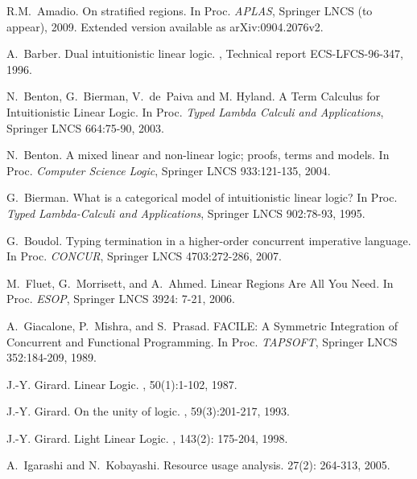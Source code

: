 \documentclass[11pt]{article}
\begin{document}
{\footnotesize

\begin{thebibliography}{99}

R.M.~Amadio.
\newblock On stratified regions.
\newblock In Proc. {\em APLAS}, Springer LNCS (to appear), 2009.
\newblock Extended version available as {\sf arXiv:0904.2076v2}.

A.~Barber.
\newblock Dual intuitionistic linear logic.
, Technical report
ECS-LFCS-96-347, 1996.

N.~Benton, G.~Bierman, V.~de~Paiva and M. Hyland.
\newblock A Term Calculus for Intuitionistic Linear Logic.
\newblock In Proc. {\em Typed Lambda Calculi and Applications}, 
Springer LNCS 664:75-90, 2003.

N.~Benton.
\newblock A mixed linear and non-linear logic; proofs, terms and models.
\newblock In Proc. {\em Computer Science Logic}, 
Springer LNCS 933:121-135, 2004.


G.~Bierman.
\newblock What is a categorical model of intuitionistic linear logic?
\newblock In Proc. {\em Typed Lambda-Calculi and Applications},
\newblock Springer LNCS 902:78-93, 1995.

G.~Boudol.
\newblock Typing termination in a higher-order concurrent imperative 
language.
\newblock In Proc. {\em CONCUR}, Springer LNCS 4703:272-286, 2007.

M.~Fluet, G.~Morrisett, and A.~Ahmed.
\newblock Linear Regions Are All You Need. 
\newblock In Proc. {\em ESOP}, Springer LNCS 3924: 7-21, 2006.


A.~Giacalone, P.~Mishra, and  S.~Prasad.
\newblock 
FACILE: A Symmetric Integration of Concurrent and Functional Programming. 
\newblock In Proc. {\em TAPSOFT}, Springer LNCS 352:184-209, 1989.

J.-Y. Girard.
\newblock Linear Logic. 
, 50(1):1-102, 1987. 

J.-Y. Girard.
\newblock On the unity of logic.
, 59(3):201-217, 1993.

J.-Y. Girard.
\newblock Light Linear Logic. 
, 143(2): 175-204, 1998.

A.~Igarashi and N.~Kobayashi.
\newblock Resource usage analysis. 
 27(2): 264-313, 2005.


\end{thebibliography}}
\end{document}
